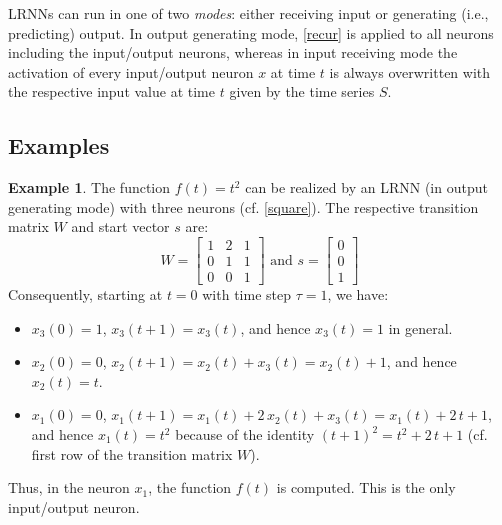 \documentclass[twoside,11pt]{article}
\theoremstyle{definition}
\newtheorem{exmp}{Example}
\begin{document}
LRNNs can run in one of two \emph{modes}: either receiving input or generating
(i.e., predicting) output. In output generating mode, \cref{recur} is applied to
all neurons including the input/output neurons, whereas in input receiving mode
the activation of every input/output neuron $x$ at time $t$ is always
overwritten with the respective input value at time $t$ given by the time series
$S$.

\subsection{Examples}

\begin{exmp}\label{parabola}
The function $f(t) = t^2$ can be realized by an LRNN (in output generating mode)
with three neurons (cf. \cref{square}). The respective transition matrix
$W$ and start vector $s$ are:
\[ W = \left[ \begin{array}{ccc}
	1 & 2 & 1\\
	0 & 1 & 1\\
	0 & 0 & 1
   \end{array} \right]
   \textrm{~and~} s = \left[ \begin{array}{c}
	0\\
	0\\
	1
   \end{array} \right]
\]
Consequently, starting at $t=0$ with time step $\tau=1$, we have:
\begin{itemize}
  \item $x_3(0) = 1$, $x_3(t+1) = x_3(t)$, and hence $x_3(t)=1$ in general.
  \item $x_2(0) = 0$, $x_2(t+1) = x_2(t)+x_3(t) = x_2(t)+1$, and hence $x_2(t)=t$.
  \item $x_1(0) = 0$, $x_1(t+1) = x_1(t)+ 2\,x_2(t) + x_3(t) = x_1(t)+ 2\,t +
	1$, and hence $x_1(t) = t^2$ because of the identity $(t+1)^2 = t^2 +
	2\,t + 1$ (cf. first row of the transition matrix $W$).
\end{itemize}
Thus, in the neuron $x_1$, the function $f(t)$ is computed. This is the only
input/output neuron.
\end{exmp}
\end{document}
